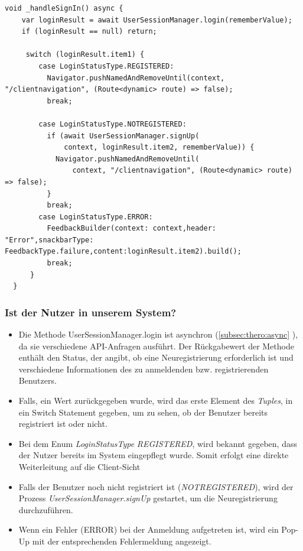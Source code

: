 \begin{lstlisting}[caption=\_handleSignIn Methode,style=goMono]
void _handleSignIn() async {
    var loginResult = await UserSessionManager.login(rememberValue);
    if (loginResult == null) return;

     switch (loginResult.item1) {
        case LoginStatusType.REGISTERED:
          Navigator.pushNamedAndRemoveUntil(context, "/clientnavigation", (Route<dynamic> route) => false);
          break;

        case LoginStatusType.NOTREGISTERED:
          if (await UserSessionManager.signUp(
              context, loginResult.item2, rememberValue)) {
            Navigator.pushNamedAndRemoveUntil(
                context, "/clientnavigation", (Route<dynamic> route) => false);
          }
          break;
        case LoginStatusType.ERROR:
          FeedbackBuilder(context: context,header: "Error",snackbarType: FeedbackType.failure,content:loginResult.item2).build();
          break;
      }
  }
\end{lstlisting}

\subsubsection{Ist der Nutzer in unserem System?}
\begin{itemize}
    \item Die Methode UserSessionManager.login ist asynchron (\ref{subsec:thero:async} ), da sie verschiedene API-Anfragen ausführt. Der Rückgabewert der Methode enthält den Status, der angibt, ob eine Neuregistrierung erforderlich ist und verschiedene Informationen des zu anmeldenden bzw. registrierenden Benutzers.  
   \item Falls, ein Wert zurückgegeben wurde, wird das erste Element des {\textit{Tuples}}, in ein Switch Statement gegeben, um zu sehen, ob der Benutzer bereits registriert ist oder nicht. 
    \item Bei dem Enum  {\textit{LoginStatusType}} {\textit{REGISTERED}}, wird bekannt gegeben, dass der Nutzer bereits im System eingepflegt wurde. Somit erfolgt eine direkte Weiterleitung auf die Client-Sicht 
    \item Falls der Benutzer noch nicht registriert ist ({\textit{NOTREGISTERED}}), wird der Prozess {\textit{UserSessionManager.signUp}} gestartet, um die Neuregistrierung durchzuführen.
    \item Wenn ein Fehler (ERROR) bei der Anmeldung aufgetreten ist, wird ein Pop-Up mit der entsprechenden Fehlermeldung angezeigt.
\end{itemize}

